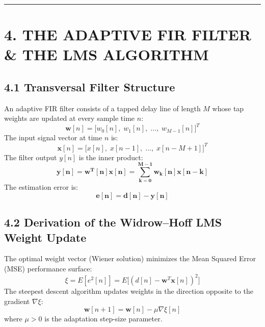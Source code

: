 \documentclass[11pt,a4paper]{article}
\begin{document}
\noindent\rule{\textwidth}{0.5pt}

\section{4. THE ADAPTIVE FIR FILTER \& THE LMS ALGORITHM}

\subsection{4.1 Transversal Filter Structure}
An adaptive FIR filter consists of a tapped delay line of length $M$ whose tap weights are updated at every sample time $n$:
\begin{equation}
\mathbf{w}[n] = \big[ w_0[n], \; w_1[n], \; \dots, \; w_{M-1}[n] \big]^T
\end{equation}
The input signal vector at time $n$ is:
\begin{equation}
\mathbf{x}[n] = \big[ x[n], \; x[n-1], \; \dots, \; x[n-M+1] \big]^T
\end{equation}
The filter output $y[n]$ is the inner product:
\begin{equation}
\mathbf{y[n] = \mathbf{w}^T[n] \mathbf{x}[n] = \sum_{k=0}^{M-1} w_k[n] x[n-k]}
\label{eq:lms_y}
\end{equation}
The estimation error is:
\begin{equation}
\mathbf{e[n] = d[n] - y[n]}
\label{eq:lms_e}
\end{equation}

\subsection{4.2 Derivation of the Widrow--Hoff LMS Weight Update}
The optimal weight vector (Wiener solution) minimizes the Mean Squared Error (MSE) performance surface:
\begin{equation}
\xi = E[e^2[n]] = E\big[(d[n] - \mathbf{w}^T \mathbf{x}[n])^2\big]
\end{equation}
The steepest descent algorithm updates weights in the direction opposite to the gradient $\nabla \xi$:
\begin{equation}
\mathbf{w}[n+1] = \mathbf{w}[n] - \mu \nabla \xi[n]
\end{equation}
where $\mu > 0$ is the adaptation step-size parameter.
\end{document}
